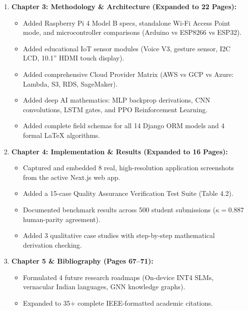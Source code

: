 \documentclass[11pt,a4paper]{article}
\begin{document}
\begin{enumerate}[leftmargin=*]
\begin{itemize}
        \item Redesigned the Literature Survey Comparison Matrix (Table 2.1) with full-width columns to prevent syllable squishing.
    \end{itemize}
    \item \textbf{Chapter 3: Methodology \& Architecture (Expanded to 22 Pages):}
    \begin{itemize}
        \item Added Raspberry Pi 4 Model B specs, standalone Wi-Fi Access Point mode, and microcontroller comparisons (Arduino vs ESP8266 vs ESP32).
        \item Added educational IoT sensor modules (Voice V3, gesture sensor, I2C LCD, 10.1'' HDMI touch display).
        \item Added comprehensive Cloud Provider Matrix (AWS vs GCP vs Azure: Lambda, S3, RDS, SageMaker).
        \item Added deep AI mathematics: MLP backprop derivations, CNN convolutions, LSTM gates, and PPO Reinforcement Learning.
        \item Added complete field schemas for all 14 Django ORM models and 4 formal LaTeX algorithms.
    \end{itemize}
    \item \textbf{Chapter 4: Implementation \& Results (Expanded to 16 Pages):}
    \begin{itemize}
        \item Captured and embedded 8 real, high-resolution application screenshots from the active Next.js web app.
        \item Added a 15-case Quality Assurance Verification Test Suite (Table 4.2).
        \item Documented benchmark results across 500 student submissions ($\kappa = 0.887$ human-parity agreement).
        \item Added 3 qualitative case studies with step-by-step mathematical derivation checking.
    \end{itemize}
    \item \textbf{Chapter 5 \& Bibliography (Pages 67--71):}
    \begin{itemize}
        \item Formulated 4 future research roadmaps (On-device INT4 SLMs, vernacular Indian languages, GNN knowledge graphs).
        \item Expanded to 35+ complete IEEE-formatted academic citations.
    \end{itemize}
\end{enumerate}
\end{document}
